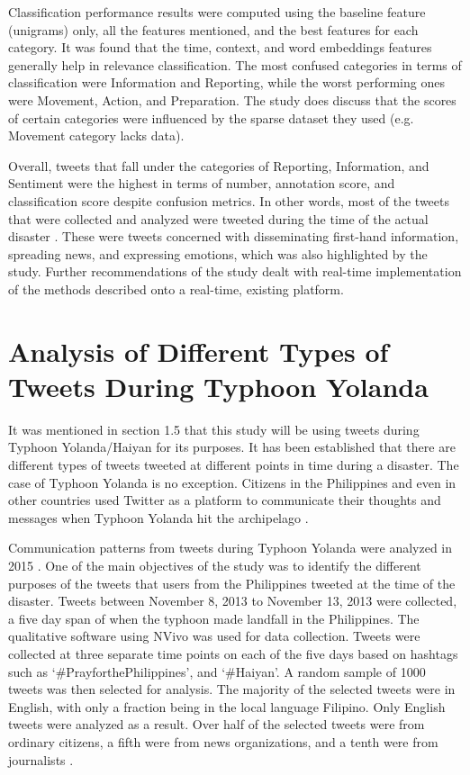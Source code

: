 Classification performance results were computed using the baseline feature (unigrams) only, all the features mentioned, and the best features for each category. It was found that the time, context, and word embeddings features generally help in relevance classification. The most confused categories in terms of classification were Information and Reporting, while the worst performing ones were Movement, Action, and Preparation. The study does discuss that the scores of certain categories were influenced by the sparse dataset they used (e.g. Movement category lacks data). 

Overall, tweets that fall under the categories of Reporting, Information, and Sentiment were the highest in terms of number, annotation score, and classification score despite confusion metrics. In other words, most of the tweets that were collected and analyzed were tweeted during the time of the actual disaster \cite{cat2016}. These were tweets concerned with disseminating first-hand information, spreading news, and expressing emotions, which was also highlighted by the study. Further recommendations of the study dealt with real-time implementation of the methods described onto a real-time, existing platform.

\section{Analysis of Different Types of Tweets During Typhoon Yolanda}
It was mentioned in section 1.5 that this study will be using tweets during Typhoon Yolanda/Haiyan for its purposes. It has been established that there are different types of tweets tweeted at different points in time during a disaster. The case of Typhoon Yolanda is no exception. Citizens in the Philippines and even in other countries used Twitter as a platform to communicate their thoughts and messages when Typhoon Yolanda hit the archipelago \cite{TTC2015}. 

Communication patterns from tweets during Typhoon Yolanda were analyzed in 2015 \cite{TTC2015}. One of the main objectives of the study was to identify the different purposes of the tweets that users from the Philippines tweeted at the time of the disaster. Tweets between November 8, 2013 to November 13, 2013 were collected, a five day span of when the typhoon made landfall in the Philippines. The qualitative software using NVivo was used for data collection. Tweets were collected at three separate time points on each of the five days based on hashtags such as ‘#PrayforthePhilippines’, and ‘#Haiyan’. A random sample of 1000 tweets was then selected for analysis. The majority of the selected tweets were in English, with only a fraction being in the local language Filipino. Only English tweets were analyzed as a result. Over half of the selected tweets were from ordinary citizens, a fifth were from news organizations, and a tenth were from journalists \cite{TTC2015}. 

